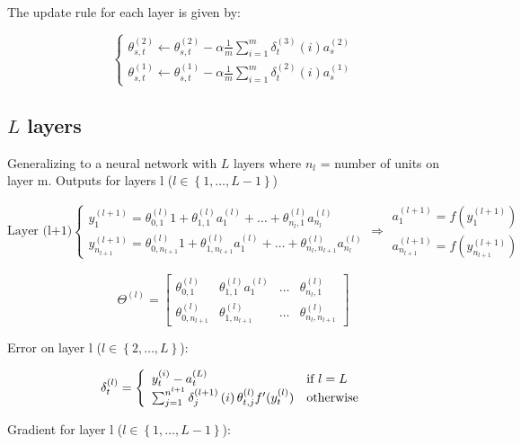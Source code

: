 \documentclass[a4, article]{article}
\begin{document}
The update rule for each layer is given by:

\[
\left\{
\begin{array}{c}
\theta_{s, t}^{(2)} \leftarrow \theta_{s, t}^{(2)} - \alpha \frac{1}{m} \sum_{i=1}^m \delta_t^{(3)}\left( i \right) a_s^{(2)} \\
\theta_{s, t}^{(1)} \leftarrow \theta_{s, t}^{(1)} - \alpha \frac{1}{m} \sum_{i=1}^m \delta_t^{(2)}\left( i \right) a_s^{(1)}
\end{array}
\right.
\]

\subsection{$L$ layers}

Generalizing to a neural network with $L$ layers where $n_l$ = number of units on layer m. Outputs for layers l ($l \in \left\{ 1, \dots, L-1 \right\} $)

\[
\mbox{Layer (l+1)}
\left\{
\begin{array}{l}
y_1^{(l+1)} = \theta_{0, 1}^{(l)} 1 + \theta_{1, 1}^{(l)} a_1^{(l)} + \dots + \theta_{n_l, 1}^{(l)} a_{n_l}^{(l)} 
\\ y_{n_{l+1}}^{(l+1)} = \theta_{0, n_{l+1}}^{(l)} 1 + \theta_{1, n_{l+1}}^{(l)} a_1^{(l)} + \dots + \theta_{n_l, n_{l+1}}^{(l)} a_{n_l}^{(l)}
\end{array}
\right.
\Rightarrow
\begin{array}{l}
a_1^{(l+1)} = f(y_1^{(l+1)}) \\
a_{n_{l+1}}^{(l+1)} = f(y_{n_{l+1}}^{(l+1)})
\end{array}
\]

\[
\Theta^{(l)} =
\left[
\begin{array}{cccc}
\theta_{0, 1}^{(l)} & \theta_{1, 1}^{(l)} a_1^{(l)} & \dots & \theta_{n_l, 1}^{(l)} \\ 
\theta_{0, n_{l+1}}^{(l)} & \theta_{1, n_{l+1}}^{(l)} & \dots & \theta_{n_l, n_{l+1}}^{(l)}
\end{array}
\right]
\]

Error on layer l ($l \in \left\{ 2, \dots, L \right\} $):

\[
\delta_t^{(l)} =
\left\{
\begin{array}{l l}
y_t^{(i)} - a_t^{(L)} & \mbox{if $l = L$} \\
\sum_{j=1}^{n^{l+1}}  \delta_j^{(l+1)} \left( i \right) \theta_{t, j}^{(l)} f'(y_t^{(l)}) & \mbox{otherwise}
\end{array}
\right.
\]

Gradient for layer l ($l \in \left\{ 1, \dots, L-1 \right\} $):
\end{document}
